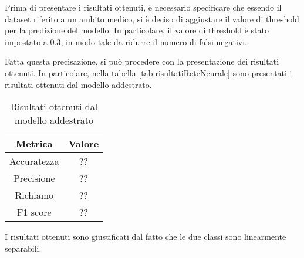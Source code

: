 Prima di presentare i risultati ottenuti, è necessario specificare che essendo 
il dataset riferito a un ambito medico, si è deciso di aggiustare il valore di
threshold per la predizione del modello. In particolare, il valore di threshold
è stato impostato a $0.3$, in modo tale da ridurre il numero di falsi negativi.

Fatta questa precisazione, si può procedere con la presentazione dei risultati
ottenuti. In particolare, nella tabella \ref{tab:risultatiReteNeurale} sono
presentati i risultati ottenuti dal modello addestrato.

\begin{table}[ht]
    \centering
    \begin{tabular}{|c|c|}
        \hline
        \textbf{Metrica} & \textbf{Valore} \\
        \hline
        Accuratezza & ?? \\
        \hline
        Precisione & ?? \\
        \hline
        Richiamo & ?? \\
        \hline
        F1 score & ?? \\
        \hline
    \end{tabular}
    \caption{Risultati ottenuti dal modello addestrato}
    \label{tab:risultatiBayes}
\end{table}

I risultati ottenuti sono giustificati dal fatto che le due classi sono linearmente
separabili.

